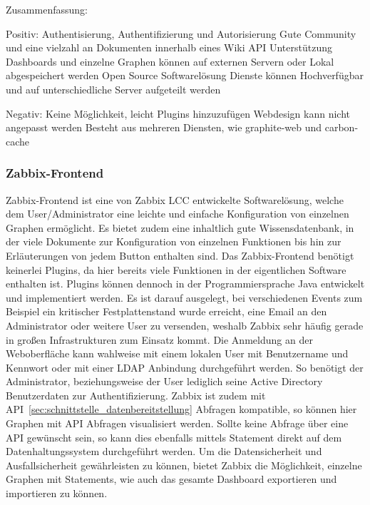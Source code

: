 Zusammenfassung:

\begin{outline}
  Positiv:
  \1 Authentisierung, Authentifizierung und Autorisierung
  \1 Gute Community und eine vielzahl an Dokumenten innerhalb eines Wiki
  \1 API Unterstützung
  \1 Dashboards und einzelne Graphen können auf externen Servern oder Lokal
  abgespeichert werden
  \1 Open Source Softwarelösung
  \1 Dienste können Hochverfügbar und auf unterschiedliche Server aufgeteilt
  werden

  Negativ:
  \1 Keine Möglichkeit, leicht Plugins hinzuzufügen
  \1 Webdesign kann nicht angepasst werden
  \1 Besteht aus mehreren Diensten, wie graphite-web und carbon-cache
\end{outline}


\subsubsection{Zabbix-Frontend}
\label{subsubsec:zabbix-frontend}
Zabbix-Frontend ist eine von Zabbix LCC entwickelte Softwarelösung, welche dem
User/Administrator eine leichte und einfache Konfiguration von einzelnen
Graphen ermöglicht. Es bietet zudem eine inhaltlich gute Wissensdatenbank, in
der viele Dokumente zur Konfiguration von einzelnen Funktionen bis hin zur
Erläuterungen von jedem Button enthalten sind. Das Zabbix-Frontend benötigt
keinerlei Plugins, da hier bereits viele Funktionen in der eigentlichen
Software enthalten ist. Plugins können dennoch in der Programmiersprache Java
entwickelt und implementiert werden. Es ist darauf ausgelegt, bei verschiedenen
Events zum Beispiel ein kritischer Festplattenstand wurde erreicht, eine Email
an den Administrator oder weitere User zu versenden, weshalb Zabbix sehr häufig
gerade in großen Infrastrukturen zum Einsatz kommt. Die Anmeldung an der
Weboberfläche kann wahlweise mit einem lokalen User mit Benutzername und
Kennwort oder mit einer LDAP Anbindung durchgeführt werden. So benötigt der
Administrator, beziehungsweise der User lediglich seine Active Directory
Benutzerdaten zur Authentifizierung.  Zabbix ist zudem mit
API~\ref{sec:schnittstelle_datenbereitstellung} Abfragen kompatible, so
können hier Graphen mit API Abfragen visualisiert werden. Sollte keine Abfrage
über eine API gewünscht sein, so kann dies ebenfalls mittels Statement direkt
auf dem Datenhaltungssystem durchgeführt werden. Um die Datensicherheit und
Ausfallsicherheit gewährleisten zu können, bietet Zabbix die Möglichkeit,
einzelne Graphen mit Statements, wie auch das gesamte Dashboard exportieren und
importieren zu können.


